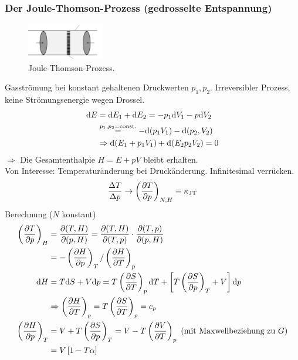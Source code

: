 \subsubsection{Der Joule-Thomson-Prozess (gedrosselte Entspannung)}
\begin{figure}[H]
\begin{center}
  \includegraphics[width=0.3\textwidth]{../img/joule-thomson-process.pdf}
  \caption{Joule-Thomson-Prozess.}
  \label{img:joule-thomson-process}
\end{center}
\end{figure}
Gasströmung bei konstant gehaltenen Druckwerten $p_1, p_2$. Irreversibler Prozess, keine Strömungsenergie wegen Drossel.
\begin{equation}
    \begin{split}
        \mathrm{d} E &= \mathrm{d} E_1 + \mathrm{d} E_2 = - p_1 \mathrm{d} V_1 - p \mathrm{d} V_2 \\
        & \overset{p_1, p_2 = \text{const.}}{=} - \mathrm{d} (p_1 V_1) - \mathrm{d} (p_2, V_2) \\
        & \Rightarrow \mathrm{d} (E_1 + p_1 V_1) + \mathrm{d} (E_2 p_2 V_2) = 0
    \end{split}
\end{equation}
$\Rightarrow$ Die Gesamtenthalpie $H = E + p V$ bleibt erhalten.\\
Von Interesse: Temperaturänderung bei Druckänderung. Infinitesimal verrücken.
\begin{equation}
    \frac{\Delta T}{\Delta p} \to \left( \frac{\partial T}{\partial p} \right)_{N, H} \equiv \kappa_\text{JT}
\end{equation}
Berechnung ($N$ konstant)
\begin{equation}
    \begin{split}
     \left( \frac{\partial T}{\partial p} \right)_{H} &= \frac{\partial (T, H)}{\partial (p, H)} = \frac{\partial (T, H)}{\partial (T, p)} \cdot \frac{\partial (T, p)}{\partial (p, H)} \\ 
    &= - \left( \frac{\partial H}{\partial p} \right)_{T} / \left( \frac{\partial H}{\partial T} \right)_{p} \\
    \mathrm{d} H &= T \mathrm{d} S + V \mathrm{d} p = T \left( \frac{\partial S}{\partial T} \right)_{p} \mathrm{d} T + \left[ T \left( \frac{\partial S}{\partial p} \right)_{T} + V \right] \mathrm{d} p \\
    & \Rightarrow \left( \frac{\partial H}{\partial T} \right)_{p} = T \left( \frac{\partial S}{\partial T} \right)_{p} = c_p \\
    \left( \frac{\partial H}{\partial p} \right)_{T} &= V + T \left( \frac{\partial S}{\partial p} \right)_{T} = V - T \left( \frac{\partial V}{\partial T} \right)_{p} \text{ (mit Maxwellbeziehung zu $G$)} \\
    &= V \left[ 1 - T \alpha \right]
    \end{split}
\end{equation}

